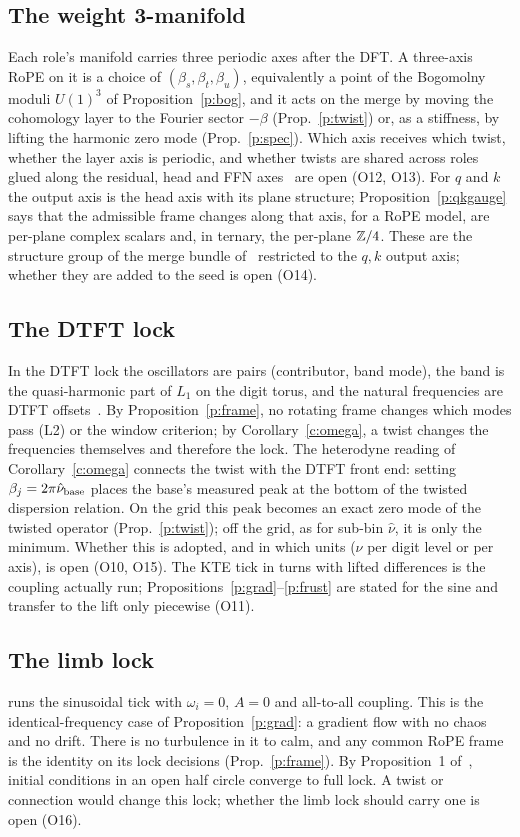 \documentclass[10pt]{article}
\theoremstyle{definition}
\newcommand{\code}[1]{\texttt{\detokenize{#1}}}
\begin{document}
\subsection{The weight 3-manifold}
Each role's manifold carries three periodic axes after the DFT. A three-axis RoPE on it is a choice of $(\beta_s,\beta_t,\beta_u)$, equivalently a point of the Bogomolny moduli $U(1)^3$ of Proposition~\ref{p:bog}, and it acts on the merge by moving the cohomology layer to the Fourier sector $-\beta$ (Prop.~\ref{p:twist}) or, as a stiffness, by lifting the harmonic zero mode (Prop.~\ref{p:spec}). Which axis receives which twist, whether the layer axis is periodic, and whether twists are shared across roles glued along the residual, head and FFN axes~\cite{mono} are open (O12, O13). For $q$ and $k$ the output axis is the head axis with its plane structure; Proposition~\ref{p:qkgauge} says that the admissible frame changes along that axis, for a RoPE model, are per-plane complex scalars and, in ternary, the per-plane $\mathbb Z/4$. These are the structure group of the merge bundle of~\cite{mono} restricted to the $q,k$ output axis; whether they are added to the seed is open (O14).

\subsection{The DTFT lock}
In the DTFT lock the oscillators are pairs (contributor, band mode), the band is the quasi-harmonic part of $L_1$ on the digit torus, and the natural frequencies are DTFT offsets~\cite{dtft}. By Proposition~\ref{p:frame}, no rotating frame changes which modes pass (L2) or the window criterion; by Corollary~\ref{c:omega}, a twist changes the frequencies themselves and therefore the lock. The heterodyne reading of Corollary~\ref{c:omega} connects the twist with the DTFT front end: setting $\beta_j=2\pi\hat\nu_{\rm base}$ places the base's measured peak at the bottom of the twisted dispersion relation. On the grid this peak becomes an exact zero mode of the twisted operator (Prop.~\ref{p:twist}); off the grid, as for sub-bin $\hat\nu$, it is only the minimum. Whether this is adopted, and in which units ($\nu$ per digit level or per axis), is open (O10, O15). The KTE tick in turns with lifted differences is the coupling actually run; Propositions~\ref{p:grad}--\ref{p:frust} are stated for the sine and transfer to the lift only piecewise (O11).

\subsection{The limb lock}
\code{lockLimb} runs the sinusoidal tick with $\omega_i=0$, $A=0$ and all-to-all coupling. This is the identical-frequency case of Proposition~\ref{p:grad}: a gradient flow with no chaos and no drift. There is no turbulence in it to calm, and any common RoPE frame is the identity on its lock decisions (Prop.~\ref{p:frame}). By Proposition~1 of~\cite{dtft}, initial conditions in an open half circle converge to full lock. A twist or connection would change this lock; whether the limb lock should carry one is open (O16).
\end{document}
